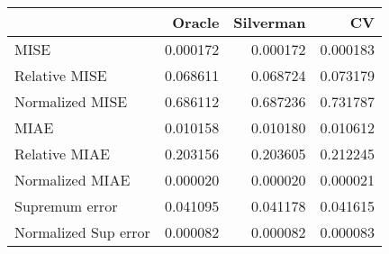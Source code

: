 \begin{tabular}{lrrr}
  \toprule
 & Oracle & Silverman & CV \\ 
  \midrule
MISE & 0.000172 & 0.000172 & 0.000183 \\ 
  Relative MISE & 0.068611 & 0.068724 & 0.073179 \\ 
  Normalized MISE & 0.686112 & 0.687236 & 0.731787 \\ 
  MIAE & 0.010158 & 0.010180 & 0.010612 \\ 
  Relative MIAE & 0.203156 & 0.203605 & 0.212245 \\ 
  Normalized MIAE & 0.000020 & 0.000020 & 0.000021 \\ 
  Supremum error & 0.041095 & 0.041178 & 0.041615 \\ 
  Normalized Sup error & 0.000082 & 0.000082 & 0.000083 \\ 
   \bottomrule
\end{tabular}
